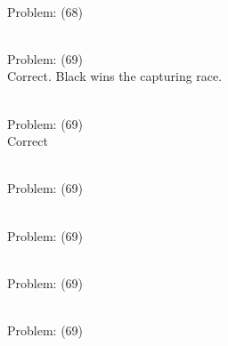 \documentclass[11pt]{article}
\begin{document}
\begin{minipage}[t]{0.5\textwidth}
  {\centering
  
\\
Problem: (68)\\
  }
\end{minipage}
\begin{minipage}[t]{0.5\textwidth}
  {\centering
  
\\
Problem: (69)\\
Correct. Black wins the capturing race.\\
  }
\end{minipage}
\begin{minipage}[t]{0.5\textwidth}
  {\centering
  
\\
Problem: (69)\\
Correct\\
  }
\end{minipage}
\begin{minipage}[t]{0.5\textwidth}
  {\centering
  
\\
Problem: (69)\\
  }
\end{minipage}
\begin{minipage}[t]{0.5\textwidth}
  {\centering
  
\\
Problem: (69)\\
  }
\end{minipage}
\begin{minipage}[t]{0.5\textwidth}
  {\centering
  
\\
Problem: (69)\\
  }
\end{minipage}
\begin{minipage}[t]{0.5\textwidth}
  {\centering
  
\\
Problem: (69)\\
  }
\end{minipage}
\end{document}
